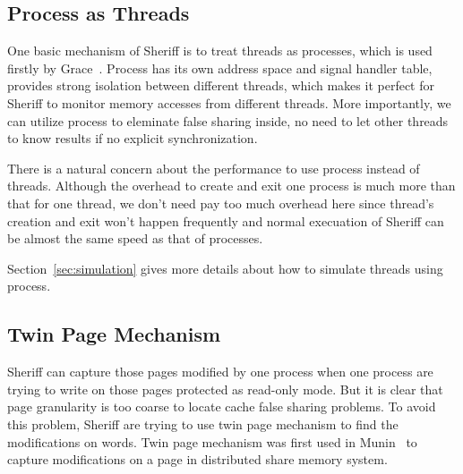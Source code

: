 \subsection{Process as Threads}
One basic mechanism of Sheriff is to treat threads as processes, which is used firstly by Grace~\cite{grace}.
Process has its own address space and signal handler table, provides strong isolation between different threads, 
which makes it perfect for Sheriff
to monitor memory accesses from different threads.
More importantly, we can utilize process to eleminate false sharing inside, no need
to let other threads to know results if no explicit synchronization.

There is a natural concern about the performance to use process instead of threads.
Although the overhead to create and exit one process is       
much more than that for one thread, we don't need pay too much overhead here since  
thread's creation and exit won't happen frequently and normal execuation of Sheriff 
can be almost the same speed as that of processes.

Section~\ref{sec:simulation} gives more details about how to simulate threads using process.
\subsection{Twin Page Mechanism}
\label{overview-twinpage}
Sheriff can capture those pages modified by one process 
when one process are trying to write on those pages protected as read-only mode.
But it is clear that page granularity is too coarse to locate cache false sharing problems.  
To avoid this problem, Sheriff are trying to use twin page mechanism to find the modifications on words. 
Twin page mechanism was first used in Munin~\cite{dsm:treadmarks} to 
capture modifications on a page in distributed share memory system.

